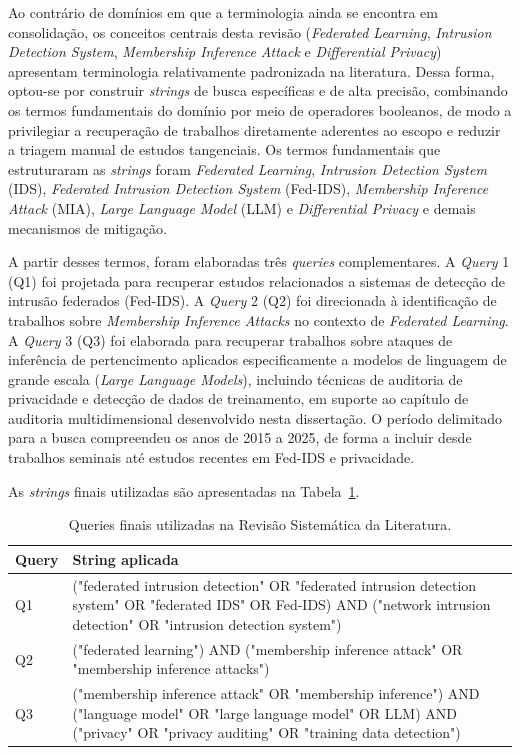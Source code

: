 \documentclass[
	12pt,				%
	openright,			%
	oneside,			%
	a4paper,			%
	english,			%
	french,				%
	spanish,			%
	brazil,				%
	]{abntex2}
\begin{document}
Ao contrário de domínios em que a terminologia ainda se encontra em consolidação, os conceitos centrais desta revisão (\textit{Federated Learning}, \textit{Intrusion Detection System}, \textit{Membership Inference Attack} e \textit{Differential Privacy}) apresentam terminologia relativamente padronizada na literatura. Dessa forma, optou-se por construir \textit{strings} de busca específicas e de alta precisão, combinando os termos fundamentais do domínio por meio de operadores booleanos, de modo a privilegiar a recuperação de trabalhos diretamente aderentes ao escopo e reduzir a triagem manual de estudos tangenciais. Os termos fundamentais que estruturaram as \textit{strings} foram \textit{Federated Learning}, \textit{Intrusion Detection System} (IDS), \textit{Federated Intrusion Detection System} (Fed-IDS), \textit{Membership Inference Attack} (MIA), \textit{Large Language Model} (LLM) e \textit{Differential Privacy} e demais mecanismos de mitigação.

A partir desses termos, foram elaboradas três \textit{queries} complementares. A \textit{Query} 1 (Q1) foi projetada para recuperar estudos relacionados a sistemas de detecção de intrusão federados (Fed-IDS). A \textit{Query} 2 (Q2) foi direcionada à identificação de trabalhos sobre \textit{Membership Inference Attacks} no contexto de \textit{Federated Learning}. A \textit{Query} 3 (Q3) foi elaborada para recuperar trabalhos sobre ataques de inferência de pertencimento aplicados especificamente a modelos de linguagem de grande escala (\textit{Large Language Models}), incluindo técnicas de auditoria de privacidade e detecção de dados de treinamento, em suporte ao capítulo de auditoria multidimensional desenvolvido nesta dissertação. O período delimitado para a busca compreendeu os anos de 2015 a 2025, de forma a incluir desde trabalhos seminais até estudos recentes em Fed-IDS e privacidade.

As \textit{strings} finais utilizadas são apresentadas na Tabela~\ref{tab:queries_strings}.

\begin{table}[H]
\centering
\caption{Queries finais utilizadas na Revisão Sistemática da Literatura.}
\label{tab:queries_strings}
\begin{tabular}{lp{10cm}}
\hline
\textbf{Query} & \textbf{String aplicada} \\
\hline
Q1 &
("federated intrusion detection" OR "federated intrusion detection system" OR
"federated IDS" OR Fed-IDS) AND ("network intrusion detection" OR
"intrusion detection system") \\
\hline
Q2 &
("federated learning") AND ("membership inference attack" OR
"membership inference attacks") \\
\hline
Q3 &
("membership inference attack" OR "membership inference") AND
("language model" OR "large language model" OR LLM) AND
("privacy" OR "privacy auditing" OR "training data detection") \\
\hline
\end{tabular}
\end{table}
\end{document}
